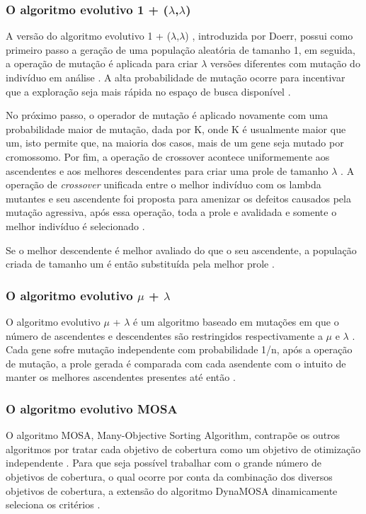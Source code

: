 \documentclass[
	12pt,				%
	oneside,			%
	a4paper,			%
	english,			%
	brazil				%
	]{abntex2ppgsi}
\begin{document}
\subsubsection{O algoritmo evolutivo 1 + ($\lambda$,$\lambda$)}
A versão do algoritmo evolutivo 1 + ($\lambda$,$\lambda$) , introduzida por Doerr, possui como primeiro passo a geração de uma população aleatória de tamanho 1, em seguida, a operação de mutação é aplicada para criar $\lambda$ versões diferentes com mutação do indivíduo em análise \cite{Campos2017}. A alta probabilidade de mutação ocorre para incentivar que a exploração seja mais rápida no espaço de busca disponível \cite{Campos2017}.

No próximo passo, o operador de mutação é aplicado novamente com uma probabilidade maior de mutação, dada por K, onde K é usualmente maior que um, isto permite que, na maioria dos casos, mais de um gene seja mutado por cromossomo. Por fim, a operação de crossover acontece uniformemente aos ascendentes e aos melhores descendentes para criar uma prole de  tamanho $\lambda$  \cite{Campos2017}. A operação de \textit{crossover} unificada entre o melhor indivíduo com os lambda mutantes e seu ascendente foi proposta para amenizar os defeitos causados pela mutação agressiva, após essa operação, toda a prole e avalidada e somente o melhor indivíduo é selecionado \cite{Campos2017}.

Se o melhor descendente é melhor avaliado do que o seu ascendente, a população criada de tamanho um é então substituída pela melhor prole \cite{Campos2017}.

\subsubsection{O algoritmo evolutivo  $\mu$ + $\lambda$}

O algoritmo evolutivo $\mu$ + $\lambda$  é um algoritmo baseado em mutações em que o número de ascendentes e descendentes são restringidos respectivamente  a $\mu$ e $\lambda$ \cite{Campos2017}. Cada gene sofre mutação independente com probabilidade 1/n, após a operação de mutação, a prole gerada é comparada com cada asendente com o intuito de manter os melhores ascendentes presentes até então \cite{Campos2017}.

\subsubsection{O algoritmo evolutivo MOSA}
O algoritmo MOSA, Many-Objective Sorting Algorithm, contrapõe os outros algoritmos por tratar cada objetivo de cobertura como um objetivo de otimização independente \cite{Campos2017}. Para que seja possível trabalhar com o grande número de objetivos de cobertura, o qual ocorre por conta da combinação dos diversos objetivos de cobertura, a extensão  do algoritmo DynaMOSA dinamicamente seleciona  os critérios  \cite{Campos2017}. 
\end{document}
